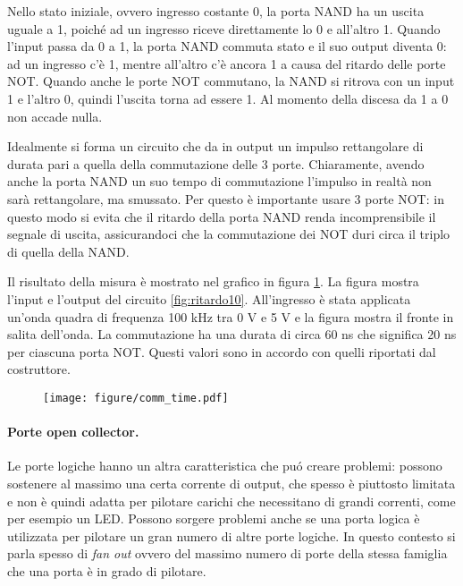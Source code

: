 Nello stato iniziale, ovvero ingresso costante 0, la porta NAND ha un uscita uguale a 1, poiché ad
un ingresso riceve direttamente lo 0 e all'altro 1. Quando l'input passa da 0 a 1,
la porta NAND commuta stato e il suo output diventa 0: ad un ingresso c'è 1, mentre all'altro c'è ancora 1 a causa del ritardo delle
porte NOT. Quando anche le porte NOT commutano, la NAND si ritrova con un input 1 e l'altro 0, quindi
l'uscita torna ad essere 1. Al momento della discesa da 1 a 0 non accade nulla.

Idealmente si forma un circuito che da in output un impulso rettangolare di durata pari a quella
della commutazione delle 3 porte. Chiaramente, avendo anche la porta NAND un suo tempo di commutazione
l'impulso in realtà non sarà rettangolare, ma smussato. Per questo è importante usare 3 porte NOT:
in questo modo si evita che il ritardo della porta NAND renda incomprensibile il segnale di uscita,
assicurandoci che la commutazione dei NOT duri circa il triplo di quella della NAND.

Il risultato della misura è mostrato nel grafico in figura \ref{fig:comm_time_10}.
La figura mostra l'input e l'output del circuito \ref{fig:ritardo10}. All'ingresso è stata applicata
un'onda quadra di frequenza 100 kHz tra 0 V e 5 V e la figura mostra il fronte in salita dell'onda.
La commutazione ha una durata di circa 60 ns che significa 20 ns per ciascuna porta NOT.
Questi valori sono in accordo con quelli riportati dal costruttore.

\begin{figure}[t]
    \centering
    \texttt{[image: figure/comm\_time.pdf]}
    \caption{}
    \label{fig:comm_time_10}
\end{figure}

\paragraph{Porte open collector.}

Le porte logiche hanno un altra caratteristica che puó creare problemi: possono sostenere
al massimo una certa corrente di output, che spesso è piuttosto limitata e non è quindi adatta
per pilotare carichi che necessitano di grandi correnti, come per esempio un LED.
Possono sorgere problemi anche se una porta logica è utilizzata per pilotare un gran numero di
altre porte logiche. In questo contesto si parla spesso di \emph{fan out} ovvero del massimo
numero di porte della stessa famiglia che una porta è in grado di pilotare.

